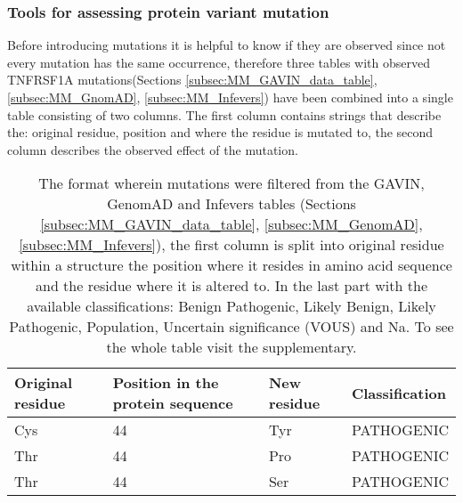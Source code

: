 	\subsubsection{Tools for assessing protein variant mutation}
	Before introducing mutations it is helpful to know if they are observed since not every mutation has the same occurrence, therefore three tables with observed TNFRSF1A mutations(Sections \ref{subsec:MM_GAVIN_data_table}, \ref{subsec:MM_GnomAD}, \ref{subsec:MM_Infevers}) have been combined into a single table consisting of two columns. The first column contains strings that describe the: original residue, position and where the residue is mutated to, the second column describes the observed effect of the mutation.	
	\begin{table}[ht]
		\begin{tabular}{ l | l | l | l}
			Original residue & Position in the protein sequence & New residue & Classification\\ \hline
			Cys & 44 & Tyr & PATHOGENIC\\
			Thr & 44 & Pro & PATHOGENIC\\
			Thr & 44 & Ser & PATHOGENIC\\
		\end{tabular}
		\caption[Sample of combined tables with observed mutations]{The format wherein mutations were filtered from the GAVIN, GenomAD and Infevers tables (Sections \ref{subsec:MM_GAVIN_data_table},  \ref{subsec:MM_GenomAD}, \ref{subsec:MM_Infevers}), the first column is split into original residue within a structure the position where it resides in amino acid sequence and the residue where it is altered to.  In the last part with the available classifications: Benign Pathogenic, Likely Benign, Likely Pathogenic, Population, Uncertain significance (VOUS) and Na. To see the whole table visit the supplementary.}
		\label{table:Res_Filtered_Mutations}
	\end{table}
	




